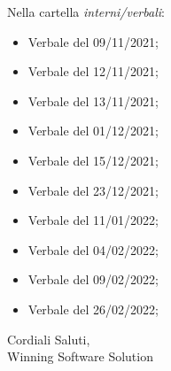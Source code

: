\documentclass[a4paper, 12pt]{letter}
\begin{document}
Nella cartella \textit{interni/verbali}:
\begin{itemize}
    \item Verbale del 09/11/2021;
    \item Verbale del 12/11/2021;
    \item Verbale del 13/11/2021;
    \item Verbale del 01/12/2021;
    \item Verbale del 15/12/2021;
    \item Verbale del 23/12/2021;
    \item Verbale del 11/01/2022;
    \item Verbale del 04/02/2022;
    \item Verbale del 09/02/2022;
    \item Verbale del 26/02/2022;
\end{itemize}
\begin{flushright}
Cordiali Saluti,\\
Winning Software Solution
\end{flushright}
\end{document}
